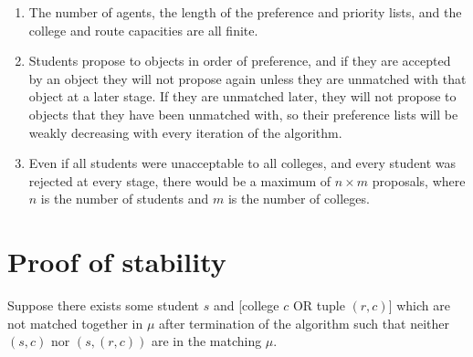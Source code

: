 \documentclass{article}
\begin{document}
\begin{enumerate}
    \item The number of agents, the length of the preference and priority lists, and the college and route capacities are all finite.
    \item Students propose to objects in order of preference, and if they are accepted by an object they will not propose again unless they are unmatched with that object at a later stage. If they are unmatched later, they will not propose to objects that they have been unmatched with, so their preference lists will be weakly decreasing with every iteration of the algorithm.
    \item Even if all students were unacceptable to all colleges, and every student was rejected at every stage, there would be a maximum of $n \times m$ proposals, where $n$ is the number of students and $m$ is the number of colleges.
\end{enumerate}


\section{Proof of stability}
Suppose there exists some student $s$ and [college $c$ OR tuple $(r,c)$] which are not matched together in $\mu$ after termination of the algorithm such that neither $(s,c)$ nor $(s,(r,c))$ are in the matching $\mu$.
\end{document}
